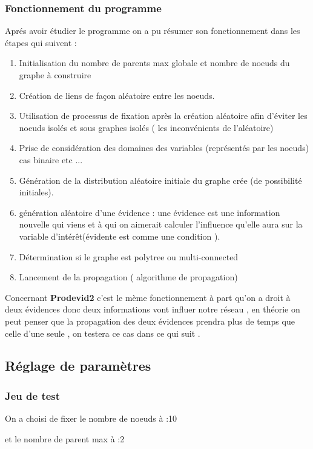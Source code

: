 \documentclass[12pt,a4paper,oneside]{book}
\begin{document}
	 \subsubsection{Fonctionnement du programme}
	 Aprés avoir étudier le programme on a pu résumer son fonctionnement dans les étapes qui suivent :
	 \begin{enumerate}
	 	\item Initialisation du nombre de parents max globale et nombre de noeuds du graphe à construire
	 	\item Création de liens de façon aléatoire entre les noeuds.
	 	\item Utilisation de processus de fixation après la création aléatoire afin d'éviter les noeuds isolés et sous graphes isolés ( les inconvénients de l'aléatoire)
	 	\item Prise de considération des domaines des variables (représentés par les noeuds)
	 	cas binaire etc ...
	 	\item Génération de la distribution aléatoire initiale du graphe crée (de possibilité initiales).
	 	\item génération aléatoire d'une évidence  : une évidence est une information nouvelle qui viens et à qui on aimerait calculer l'influence qu'elle aura sur la variable d'intérêt(évidente est comme une condition ).
	 	\item Détermination si le graphe est polytree ou multi-connected
	 	\item Lancement de la propagation ( algorithme de propagation)
	 	
	 	
	 \end{enumerate}
	 
	 Concernant \textbf{Prodevid2} c'est le mème fonctionnement à part qu'on a droit à deux évidences donc deux informations vont influer notre réseau , en théorie  on peut penser que la propagation des deux évidences prendra plus de temps que celle d'une seule , on testera ce cas dans ce qui suit .
	 
	
	\subsection{Réglage de paramètres}
	\subsubsection{Jeu de test}
	On a choisi de fixer le nombre de noeuds à :10
	
	et le nombre de parent max à :2 
	
\end{document}
